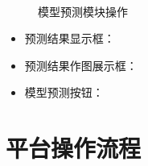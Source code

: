 \documentclass[cn,11pt,chinese]{elegantbook}
\begin{document}
\begin{figure}
{	}
	\\
	\caption{模型预测模块操作}
	\label{test}
\end{figure}

\begin{itemize}
	\item 预测结果显示框：
	\item 预测结果作图展示框：
	\item 模型预测按钮：
\end{itemize}

\chapter{平台操作流程}
\end{document}
